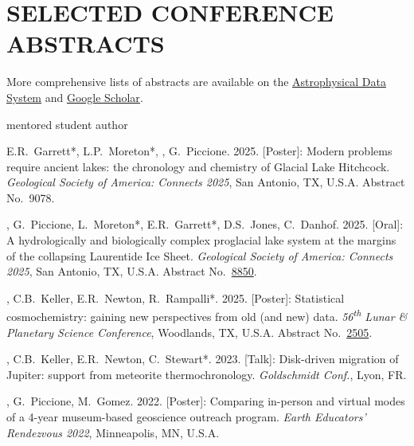 \section{SELECTED CONFERENCE ABSTRACTS}

More comprehensive lists of abstracts are available on the \href{https://ui.adsabs.harvard.edu/search/q=author%3A%22Edwards%2C%20Graham%20Harper%22}{Astrophysical Data System} and \href{https://scholar.google.com/citations?user=KHLOvgcAAAAJ&hl=en}{Google Scholar}.

\hfill* mentored student author

\begin{etaremune} [itemsep=4pt, leftmargin=3ex]
  
  \item E.R.~Garrett*, L.P.~Moreton*, \ghedwards, G.~Piccione. 2025. [Poster]: Modern problems require ancient lakes: the chronology and chemistry of Glacial Lake Hitchcock. \textit{Geological Society of America: Connects 2025}, San Antonio, TX, U.S.A. Abstract No.~9078.
  
  \item \ghedwards, G.~Piccione, L.~Moreton*, E.R.~Garrett*, D.S.~Jones, C.~Danhof. 2025. [Oral]: A hydrologically and biologically complex proglacial lake system at the margins of the collapsing Laurentide Ice Sheet. \textit{Geological Society of America: Connects 2025}, San Antonio, TX, U.S.A. Abstract No.~\href{https://gsameetings.secure-platform.com/connects25/solicitations/103002/sessiongallery/schedule/items/95040/application/8850}{8850}.

  \item \ghedwards, C.B.~Keller, E.R.~Newton, R.~Rampalli*. 2025. [Poster]: Statistical cosmochemistry: gaining new perspectives from old (and new) data. \textit{56\textsuperscript{th} Lunar \& Planetary Science Conference}, Woodlands, TX, U.S.A. Abstract No.~\href{https://www.hou.usra.edu/meetings/lpsc2025/pdf/2505.pdf}{2505}.

  \item \ghedwards, C.B.~Keller, E.R.~Newton, C.~Stewart*. 2023. [Talk]: Disk-driven migration of Jupiter: support from meteorite thermochronology. \textit{Goldschmidt Conf.}, Lyon, FR. 

  \item \ghedwards, G.~Piccione, M.~Gomez. 2022. [Poster]: Comparing in-person and virtual modes of a 4-year museum-based geoscience outreach program. \textit{Earth Educators' Rendezvous 2022}, Minneapolis, MN, U.S.A.


\end{etaremune}

